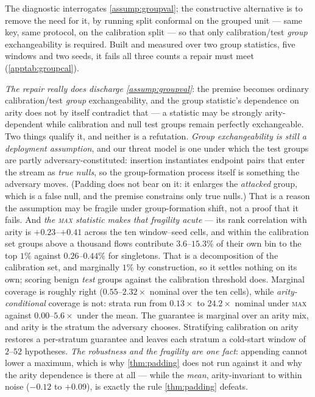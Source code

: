 \documentclass[conference]{IEEEtran}
\begin{document}
The diagnostic interrogates \cref{assump:groupval}; the constructive alternative is to remove the
need for it, by running split conformal on the grouped unit --- same key, same protocol, on the
calibration split --- so that only calibration/test \emph{group} exchangeability is required. Built
and measured over two group statistics, five windows and two seeds, it fails all three counts a
repair must meet (\cref{apptab:groupcal}).

\emph{The repair really does discharge \cref{assump:groupval}}: the premise becomes ordinary
calibration/test \emph{group} exchangeability, and the group statistic's dependence on arity does not
by itself contradict that --- a statistic may be strongly arity-dependent while calibration and null
test groups remain perfectly exchangeable. Two things qualify it, and neither is a refutation. \emph{Group exchangeability is
still a deployment assumption}, and our threat model is one under which the test groups are partly
adversary-constituted: insertion instantiates endpoint pairs that enter the stream as \emph{true
nulls}, so the group-formation process itself is something the adversary moves. (Padding does not
bear on it: it enlarges the \emph{attacked} group, which is a false null, and the premise constrains
only true nulls.) That is a reason the assumption may be fragile under group-formation shift, not a
proof that it fails. And \emph{the
\textsc{max} statistic makes that fragility acute} --- its rank correlation with arity is
$+0.23$--$+0.41$ across the ten window--seed cells, and within the calibration set groups above a
thousand flows contribute $3.6$--$15.3\%$ of their own bin to the top $1\%$ against $0.26$--$0.44\%$
for singletons. That is a decomposition of the calibration set, and marginally $1\%$ by construction, so
it settles nothing on its own; scoring benign \emph{test} groups against the calibration threshold does.
Marginal coverage is roughly right ($0.55$--$2.32\times$ nominal over the ten cells), while
\emph{arity-conditional} coverage is not: strata run from $0.13\times$ to $\mathbf{24.2\times}$ nominal
under \textsc{max} against $0.00$--$5.6\times$ under the mean. The guarantee is marginal over an arity
mix, and arity is the stratum the adversary chooses.
Stratifying calibration on arity restores a per-stratum guarantee and leaves each stratum a cold-start
window of $2$--$52$ hypotheses. \emph{The robustness and the fragility are one fact}: appending cannot
lower a maximum, which is why \cref{thm:padding} does not run against it and why the arity dependence
is there at all --- while the \emph{mean}, arity-invariant to within noise ($-0.12$ to $+0.09$), is
exactly the rule \cref{thm:padding} defeats.
\end{document}
